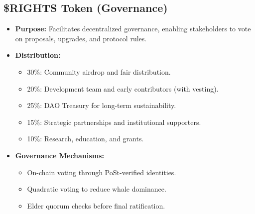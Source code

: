 \documentclass[11pt,a4paper]{article}
\begin{document}
\subsection{\$RIGHTS Token (Governance)}
\begin{itemize}
    \item \textbf{Purpose:} Facilitates decentralized governance, enabling stakeholders to vote on proposals, upgrades, and protocol rules.  
    \item \textbf{Distribution:}  
        \begin{itemize}
            \item 30\%: Community airdrop and fair distribution.  
            \item 20\%: Development team and early contributors (with vesting).  
            \item 25\%: DAO Treasury for long-term sustainability.  
            \item 15\%: Strategic partnerships and institutional supporters.  
            \item 10\%: Research, education, and grants.  
        \end{itemize}
    \item \textbf{Governance Mechanisms:}  
        \begin{itemize}
            \item On-chain voting through PoSt-verified identities.  
            \item Quadratic voting to reduce whale dominance.  
            \item Elder quorum checks before final ratification.  
        \end{itemize}
\end{itemize}
\end{document}
